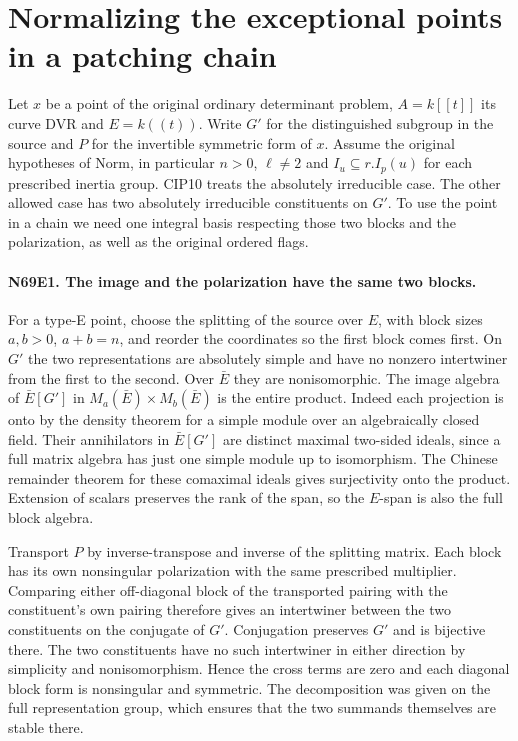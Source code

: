 \section{Normalizing the exceptional points in a patching chain}

Let $x$ be a point of the original ordinary determinant problem,
$A=k[[t]]$ its curve DVR and $E=k((t))$. Write $G'$ for the
distinguished subgroup in the source and $P$ for the invertible
symmetric form of $x$. Assume the original hypotheses of
$\mathrm{Norm}$, in particular $n>0$, $\ell\ne2$ and
$I_u\subseteq r.I_p(u)$ for each prescribed inertia group.
CIP10 treats the absolutely irreducible case. The other allowed
case has two absolutely irreducible constituents on $G'$. To use
the point in a chain we need one integral basis respecting those two
blocks and the polarization, as well as the original ordered flags.

\paragraph{N69E1. The image and the polarization have the same two blocks.}
For a type-E point, choose the splitting of the source over $E$,
with block sizes $a,b>0$, $a+b=n$, and reorder the coordinates so
the first block comes first. On $G'$ the two representations are
absolutely simple and have no nonzero intertwiner from the first to
the second. Over $\bar E$ they are nonisomorphic. The image algebra
of $\bar E[G']$ in $M_a(\bar E)\times M_b(\bar E)$ is the entire
product. Indeed each projection is onto by the density theorem for a
simple module over an algebraically closed field. Their annihilators
in $\bar E[G']$ are distinct maximal two-sided ideals, since a full
matrix algebra has just one simple module up to isomorphism.
The Chinese remainder theorem for these comaximal ideals gives
surjectivity onto the product. Extension of scalars preserves the
rank of the span, so the $E$-span is also the full block algebra.

Transport $P$ by inverse-transpose and inverse of the splitting
matrix. Each block has its own nonsingular polarization with the
same prescribed multiplier. Comparing either off-diagonal block
of the transported pairing with the constituent's own pairing
therefore gives an intertwiner between the two constituents on
the conjugate of $G'$. Conjugation preserves $G'$ and is bijective
there. The two constituents have no such intertwiner in either
direction by simplicity and nonisomorphism. Hence the cross terms
are zero and each diagonal block form is nonsingular and symmetric.
The decomposition was given on the full representation group, which
ensures that the two summands themselves are stable there.

